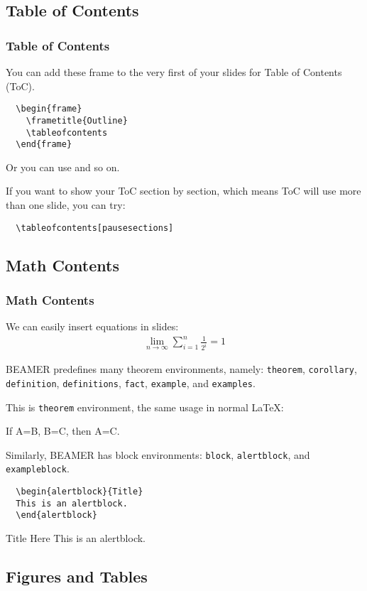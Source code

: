 \documentclass{beamer}
\newcommand{\Beamer}{\textrm{BEAMER}}
\newcommand{\cmd}[2][blue]{{\color{#1}{\ttfamily\char92 #2}}}
\newcommand{\env}[1]{\texttt{#1}}
\newcommand{\dpar}{\\ \mbox{}}
\begin{document}
\subsection{Table of Contents}
\begin{frame}[fragile]
  \frametitle{Table of Contents}
  You can add these frame to the very first of your slides for Table of Contents (ToC). 
  \begin{lstlisting}
  \begin{frame}
    \frametitle{Outline}
    \tableofcontents
  \end{frame}
  \end{lstlisting}
  
  Or you can use \cmd{AtBeginSection} and so on.\dpar
  
  If you want to show your ToC section by section, which means ToC will use more than one slide, you can try:
  \begin{lstlisting}
  \tableofcontents[pausesections]
  \end{lstlisting}
\end{frame}

\subsection{Math Contents}
\begin{frame}
  \frametitle{Math Contents}
  We can easily insert equations in slides:
  \begin{gather}
  \lim_{n\rightarrow\infty} \sum_{i=1}^n \frac{1}{2^i} = 1
  \end{gather}
  
  \Beamer{} predefines many theorem environments, namely: \env{theorem}, \env{corollary}, \env{definition}, \env{definitions}, \env{fact}, \env{example}, and \env{examples}.
\end{frame}

\begin{frame}[fragile]
  This is \env{theorem} environment, the same usage in normal \LaTeX:
  \begin{theorem}
  If A=B, B=C, then A=C. 
  \end{theorem}
  
  Similarly, \Beamer{} has block environments: \env{block}, \env{alertblock}, and \env{exampleblock}.
  \begin{lstlisting}
  \begin{alertblock}{Title}
  This is an alertblock.
  \end{alertblock}
  \end{lstlisting}
  
  \begin{alertblock}{Title Here}
  This is an alertblock.
  \end{alertblock}
  
\end{frame}

\subsection{Figures and Tables}
\end{document}
